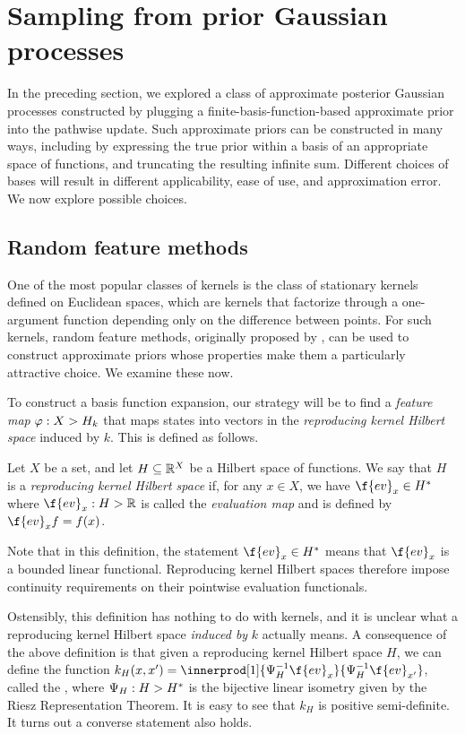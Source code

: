 \documentclass[11pt]{book}
\begin{document}
\section{Sampling from prior Gaussian processes}

In the preceding section, we explored a class of approximate posterior Gaussian processes constructed by plugging a finite-basis-function-based approximate prior into the pathwise update.
Such approximate priors can be constructed in many ways, including by expressing the true prior within a basis of an appropriate space of functions, and truncating the resulting infinite sum.
Different choices of bases will result in different applicability, ease of use, and approximation error.
We now explore possible choices.


\subsection{Random feature methods}

One of the most popular classes of kernels is the class of stationary kernels defined on Euclidean spaces, which are kernels that factorize through a one-argument function depending only on the difference between points.
For such kernels, random feature methods, originally proposed by \textcite{rahimi08}, can be used to construct approximate priors whose properties make them a particularly attractive choice.
We examine these now.

To construct a basis function expansion, our strategy will be to find a \emph{feature map} $\varphi : X \-> H_k$ that maps states into vectors in the \emph{reproducing kernel Hilbert space} induced by $k$.
This is defined as follows.

\begin{definition}
Let $X$ be a set, and let $H \subseteq \mathbb{R}^X$ be a Hilbert space of functions. 
We say that $H$ is a \emph{reproducing kernel Hilbert space} if, for any $x\in X$, we have $\f{ev}_x \in H^*$ where $\f{ev}_x : H \-> \R$ is called the \emph{evaluation map} and is defined by $\f{ev}_x f = f(x)$.
\end{definition}

Note that in this definition, the statement $\f{ev}_x \in H^*$ means that $\f{ev}_x$ is a bounded linear functional.
Reproducing kernel Hilbert spaces therefore impose continuity requirements on their pointwise evaluation functionals.

Ostensibly, this definition has nothing to do with kernels, and it is unclear what a reproducing kernel Hilbert space \emph{induced by} $k$ actually means.
A consequence of the above definition is that given a reproducing kernel Hilbert space $H$, we can define the function $k_{H}(x,x') = \innerprod[1]{\Psi_{H}^{-1}\f{ev}_x}{\Psi^{-1}_{H}\f{ev}_{x'}}$, called the , where $\Psi_{H} : H \-> H^*$ is the bijective linear isometry given by the Riesz Representation Theorem.
It is easy to see that $k_{H}$ is positive semi-definite.
It turns out a converse statement also holds.
\end{document}
